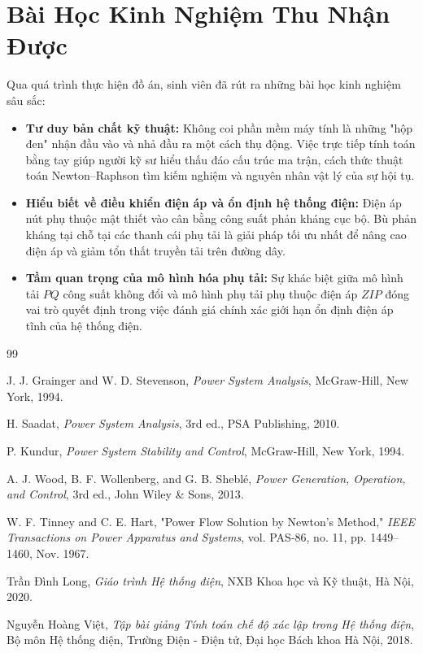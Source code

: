 \documentclass[12pt,a4paper,oneside]{report}
\begin{document}
\section{Bài Học Kinh Nghiệm Thu Nhận Được}
Qua quá trình thực hiện đồ án, sinh viên đã rút ra những bài học kinh nghiệm sâu sắc:
\begin{itemize}
    \item \textbf{Tư duy bản chất kỹ thuật:} Không coi phần mềm máy tính là những "hộp đen" nhận đầu vào và nhả đầu ra một cách thụ động. Việc trực tiếp tính toán bằng tay giúp người kỹ sư hiểu thấu đáo cấu trúc ma trận, cách thức thuật toán Newton--Raphson tìm kiếm nghiệm và nguyên nhân vật lý của sự hội tụ.
    \item \textbf{Hiểu biết về điều khiển điện áp và ổn định hệ thống điện:} Điện áp nút phụ thuộc mật thiết vào cân bằng công suất phản kháng cục bộ. Bù phản kháng tại chỗ tại các thanh cái phụ tải là giải pháp tối ưu nhất để nâng cao điện áp và giảm tổn thất truyền tải trên đường dây.
    \item \textbf{Tầm quan trọng của mô hình hóa phụ tải:} Sự khác biệt giữa mô hình tải $PQ$ công suất không đổi và mô hình phụ tải phụ thuộc điện áp $ZIP$ đóng vai trò quyết định trong việc đánh giá chính xác giới hạn ổn định điện áp tĩnh của hệ thống điện.
\end{itemize}

\begin{thebibliography}{99}

J. J. Grainger and W. D. Stevenson, \textit{Power System Analysis}, McGraw-Hill, New York, 1994.

H. Saadat, \textit{Power System Analysis}, 3rd ed., PSA Publishing, 2010.

P. Kundur, \textit{Power System Stability and Control}, McGraw-Hill, New York, 1994.

A. J. Wood, B. F. Wollenberg, and G. B. Sheblé, \textit{Power Generation, Operation, and Control}, 3rd ed., John Wiley \& Sons, 2013.

W. F. Tinney and C. E. Hart, "Power Flow Solution by Newton's Method," \textit{IEEE Transactions on Power Apparatus and Systems}, vol. PAS-86, no. 11, pp. 1449--1460, Nov. 1967.

Trần Đình Long, \textit{Giáo trình Hệ thống điện}, NXB Khoa học và Kỹ thuật, Hà Nội, 2020.

Nguyễn Hoàng Việt, \textit{Tập bài giảng Tính toán chế độ xác lập trong Hệ thống điện}, Bộ môn Hệ thống điện, Trường Điện - Điện tử, Đại học Bách khoa Hà Nội, 2018.

\end{thebibliography}
\end{document}
